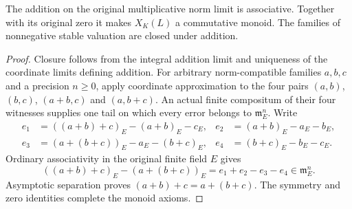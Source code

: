 \begin{proposition}
\label{fw:norm-limit-additive-monoid}
\leanok
The addition on the original multiplicative norm limit is associative.
Together with its original zero it makes $X_K(L)$ a commutative monoid.
The families of nonnegative stable valuation are closed under addition.
\end{proposition}
\begin{proof}
Closure follows from the integral addition limit and uniqueness of the
coordinate limits defining addition.
For arbitrary norm-compatible families $a,b,c$ and a precision $n\geq0$,
apply coordinate approximation to the four pairs
$(a,b)$, $(b,c)$, $(a+b,c)$ and $(a,b+c)$.
An actual finite compositum of their four witnesses supplies one tail
on which every error belongs to $\mathfrak m_E^n$. Write
\[
\begin{aligned}
 e_1&=((a+b)+c)_E-(a+b)_E-c_E,&
 e_2&=(a+b)_E-a_E-b_E,\\
 e_3&=(a+(b+c))_E-a_E-(b+c)_E,&
 e_4&=(b+c)_E-b_E-c_E.
\end{aligned}
\]
Ordinary associativity in the original finite field $E$ gives
\[
 ((a+b)+c)_E-(a+(b+c))_E=e_1+e_2-e_3-e_4
 \in\mathfrak m_E^n.
\]
Asymptotic separation proves $(a+b)+c=a+(b+c)$.
The symmetry and zero identities complete the monoid axioms.
\end{proof}

